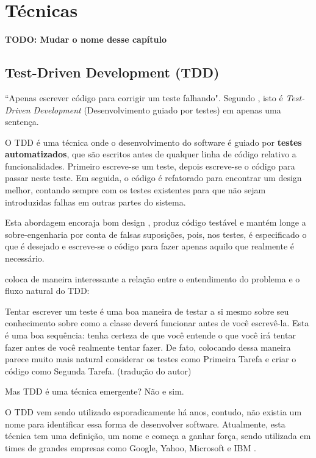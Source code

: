 \chapter{Técnicas}
\textbf{TODO: Mudar o nome desse capítulo}

\section{Test-Driven Development (TDD)}
\label{sec:tdd}
``Apenas escrever código para corrigir um teste falhando". Segundo , isto é \textit{Test-Driven Development} (Desenvolvimento guiado por testes) \cite{TDDbyExample} em apenas uma sentença.

O TDD é uma técnica onde o desenvolvimento do software é guiado por \textbf{testes automatizados}, que são escritos antes de qualquer linha de código relativo a funcionalidades. Primeiro escreve-se um teste, depois escreve-se o código para passar neste teste. Em seguida, o código é refatorado para encontrar um design melhor, contando sempre com os testes existentes para que não sejam introduzidas falhas em outras partes do sistema.

Esta abordagem encoraja bom design \cite{GrowingOOByTests}, produz código testável e mantém longe a sobre-engenharia por conta de falsas suposições, pois, nos testes, é especificado o que é desejado e escreve-se o código para fazer apenas aquilo que realmente é necessário. \cite{TestDrivenKoskela, TDDbyExample, EmpiricalTDD}

 coloca de maneira interessante a relação entre o entendimento do problema e o fluxo natural do TDD:

\begin{citacao}
Tentar escrever um teste é uma boa maneira de testar a si mesmo sobre seu conhecimento sobre como a classe deverá funcionar antes de você escrevê-la. Esta é uma boa sequência: tenha certeza de que você entende o que você irá tentar fazer antes de você realmente tentar fazer. De fato, colocando dessa maneira parece muito mais natural considerar os testes como Primeira Tarefa e criar o código como Segunda Tarefa. (tradução do autor)
\end{citacao}

Mas TDD é uma técnica emergente? Não e sim.

O TDD vem sendo utilizado esporadicamente há anos, contudo, não existia um nome para identificar essa forma de desenvolver software. Atualmente, esta técnica tem uma definição, um nome e começa a ganhar força, sendo utilizada em times de grandes empresas como Google, Yahoo, Microsoft e IBM \cite{EmpiricalTDD}.


